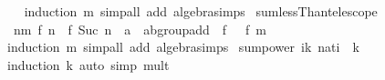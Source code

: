 \begin{isabellebody}
%
\isadelimproof
\ \ %
\endisadelimproof
%
\isatagproof
{}\isamarkupfalse%
\ {\isacharparenleft}{\kern0pt}induction\ m{\isacharparenright}{\kern0pt}\ {\isacharparenleft}{\kern0pt}simp{\isacharunderscore}{\kern0pt}all\ add{\isacharcolon}{\kern0pt}\ algebra{\isacharunderscore}{\kern0pt}simps{\isacharparenright}{\kern0pt}%
\endisatagproof
{\isafoldproof}%
%
\isadelimproof
\isanewline
%
\endisadelimproof
\isanewline
{}\isamarkupfalse%
\ sum{\isacharunderscore}{\kern0pt}lessThan{\isacharunderscore}{\kern0pt}telescope{\isacharprime}{\kern0pt}{\isacharcolon}{\kern0pt}\isanewline
\ \ {\isachardoublequoteopen}{\isacharparenleft}{\kern0pt}{\isasymSum}n{\isacharless}{\kern0pt}m{\isachardot}{\kern0pt}\ f\ n\ {\isacharminus}{\kern0pt}\ f\ {\isacharparenleft}{\kern0pt}Suc\ n{\isacharparenright}{\kern0pt}\ {\isacharcolon}{\kern0pt}{\isacharcolon}{\kern0pt}\ {\isacharprime}{\kern0pt}a\ {\isacharcolon}{\kern0pt}{\isacharcolon}{\kern0pt}\ ab{\isacharunderscore}{\kern0pt}group{\isacharunderscore}{\kern0pt}add{\isacharparenright}{\kern0pt}\ {\isacharequal}{\kern0pt}\ f\ {}\ {\isacharminus}{\kern0pt}\ f\ m{\isachardoublequoteclose}\isanewline
%
\isadelimproof
\ \ %
\endisadelimproof
%
\isatagproof
{}\isamarkupfalse%
\ {\isacharparenleft}{\kern0pt}induction\ m{\isacharparenright}{\kern0pt}\ {\isacharparenleft}{\kern0pt}simp{\isacharunderscore}{\kern0pt}all\ add{\isacharcolon}{\kern0pt}\ algebra{\isacharunderscore}{\kern0pt}simps{\isacharparenright}{\kern0pt}%
\endisatagproof
{\isafoldproof}%
%
\isadelimproof
%
\endisadelimproof
%
\isadelimdocument
%
\endisadelimdocument
%
\isatagdocument
%
\isamarkuptrue%
%
\endisatagdocument
{\isafolddocument}%
%
\isadelimdocument
%
\endisadelimdocument
{}\isamarkupfalse%
\ sum{\isacharunderscore}{\kern0pt}power{}{\isacharcolon}{\kern0pt}\ {\isachardoublequoteopen}{\isacharparenleft}{\kern0pt}{\isasymSum}i{\isacharequal}{\kern0pt}{}{\isachardot}{\kern0pt}{\isachardot}{\kern0pt}{\isacharless}{\kern0pt}k{\isachardot}{\kern0pt}\ {\isacharparenleft}{\kern0pt}{}{\isacharcolon}{\kern0pt}{\isacharcolon}{\kern0pt}nat{\isacharparenright}{\kern0pt}{\isacharcircum}{\kern0pt}i{\isacharparenright}{\kern0pt}\ {\isacharequal}{\kern0pt}\ {}{\isacharcircum}{\kern0pt}k{\isacharminus}{\kern0pt}{}{\isachardoublequoteclose}\isanewline
%
\isadelimproof
\ \ %
\endisadelimproof
%
\isatagproof
{}\isamarkupfalse%
\ {\isacharparenleft}{\kern0pt}induction\ k{\isacharparenright}{\kern0pt}\ {\isacharparenleft}{\kern0pt}auto\ simp{\isacharcolon}{\kern0pt}\ mult{\isacharunderscore}{\kern0pt}{}{\isacharparenright}{\kern0pt}%

\end{isabellebody}
